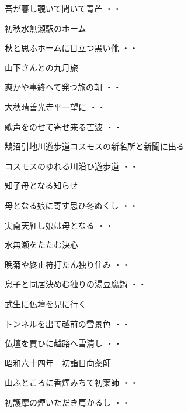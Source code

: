\begin{shiika}吾が暮し覗いて聞いて青芒
\hfill{・・}\end{shiika}
\vspace{ 0.4cm}
初秋水無瀬駅のホーム
\begin{shiika}秋と思ふホームに目立つ黒い靴
\hfill{・・}\end{shiika}
\vspace{ 0.4cm}
山下さんとの九月旅
\begin{shiika}爽かや事終へて発つ旅の朝
\hfill{・・}\end{shiika}
\begin{shiika}大秋晴善光寺平一望に
\hfill{・・}\end{shiika}
\begin{shiika}歌声をのせて寄せ来る芒波
\hfill{・・}\end{shiika}
\vspace{ 0.4cm}
鵠沼引地川遊歩道コスモスの新名所と新聞に出る
\begin{shiika}コスモスのゆれる川沿ひ遊歩道
\hfill{・・}\end{shiika}
\vspace{ 0.4cm}
知子母となる知らせ
\begin{shiika}母となる娘に寄す思ひ冬ぬくし
\hfill{・・}\end{shiika}
\begin{shiika}実南天紅し娘は母となる
\hfill{・・}\end{shiika}
\vspace{ 0.4cm}
水無瀬をたたむ決心
\begin{shiika}晩菊や終止符打たん独り住み
\hfill{・・}\end{shiika}
\begin{shiika}息子と同居決めむ独りの湯豆腐鍋
\hfill{・・}\end{shiika}
\vspace{ 0.4cm}
武生に仏壇を見に行く
\begin{shiika}トンネルを出て越前の雪景色
\hfill{・・}\end{shiika}
\begin{shiika}仏壇を買ひに越路へ雪清し
\hfill{・・}\end{shiika}
\vspace{ 0.4cm}
昭和六十四年　初詣日向薬師
\begin{shiika}山ふところに香煙みちて初薬師
\hfill{・・}\end{shiika}
\begin{shiika}初護摩の煙いただき肩かるし
\hfill{・・}\end{shiika}
